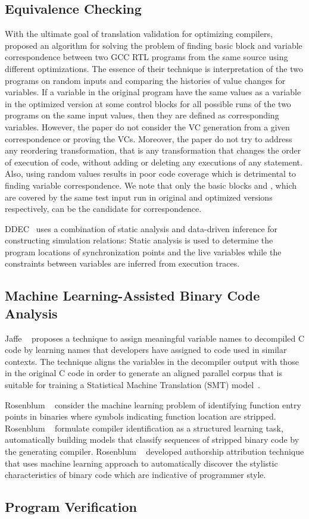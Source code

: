 \subsection{Equivalence Checking}
With the ultimate goal of translation validation for optimizing compilers, ~\cite{Iman2005} proposed an algorithm for solving the problem of finding basic block and variable correspondence between two GCC RTL programs from the same source using different optimizations.
 The essence of their technique is interpretation of the two programs on random inputs and comparing the histories of value changes for variables. If a variable  in the original program have the same values as a variable  in the optimized version at some control blocks for all possible runs of the two programs on the same input values, then they are defined as corresponding variables. However, the paper do not consider the VC generation from a given correspondence or proving the VCs. Moreover, the paper do not try to address any reordering transformation, that is any transformation that changes the order of execution of code, without adding or deleting any executions of any statement. Also, using random values results in poor code coverage which is detrimental to finding variable correspondence. We note that only the basic blocks  and , which are covered by the same test input run in original and optimized versions respectively, can be the candidate for correspondence.     

DDEC~\cite{DDEC:OOPSLA:2013} uses a combination of static analysis and data-driven inference for constructing simulation relations: Static analysis is used to determine the program locations of synchronization points and the live variables while the constraints between variables are inferred from execution traces.

\subsection{Machine Learning-Assisted Binary Code Analysis}
Jaffe \etal~\cite{Jaffe:2018ICPC} proposes a technique to assign meaningful variable names to decompiled C code by learning names that developers have assigned to code used in similar contexts. The technique aligns the variables in the decompiler output with those in the original C code in order to generate an aligned parallel corpus that is suitable for training a Statistical Machine Translation (SMT) model~\cite{Koehn:2007}.  

Rosenblum \etal~\cite{Rosenblum2007,Rosenblum:2008,Bao:2014,Shin:2015} consider the machine learning problem of identifying function entry points in binaries where symbols indicating function location are stripped.
%
Rosenblum \etal~\cite{Rosenblum:2010} formulate compiler identification as a structured learning task, automatically building models that classify sequences of stripped binary code by the generating compiler.
%
Rosenblum \etal~\cite{Rosenblum:2011} developed authorship attribution technique that uses machine learning approach to automatically discover the stylistic characteristics of binary code which are indicative of programmer style.

\subsection{Program Verification}
